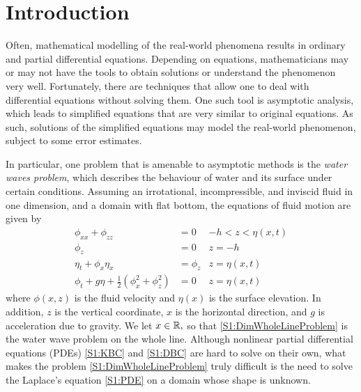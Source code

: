 
\chapter{Introduction} %

\label{chapter1} %

Often, mathematical modelling of the real-world phenomena results in ordinary and partial differential equations. Depending on equations, mathematicians may or may not have the tools to obtain solutions or understand the phenomenon very well. Fortunately, there are techniques that allow one to deal with differential equations without solving them. One such tool is asymptotic analysis, which leads to simplified equations that are very similar to original equations. As such, solutions of the simplified equations may model the real-world phenomenon, subject to some error estimates.

In particular, one problem that is amenable to asymptotic methods is the \textit{water waves problem}, which describes the behaviour of water and its surface under certain conditions. Assuming an irrotational, incompressible, and inviscid fluid in one dimension, and a domain with flat bottom, the equations of fluid motion are given by
\begin{subequations} \label{S1:DimWholeLineProblem}
\begin{align}
\phi_{xx} + \phi_{zz} &= 0 &-h < z < \eta(x,t) \label{S1:PDE}\\
\phi_{z} &= 0 &z = -h \label{S1:BBC}\\
\eta_t + \phi_{x}\eta_{x} &= \phi_{z} & z = \eta(x,t) \label{S1:KBC}\\
\phi_t + g\eta + \frac{1}{2}(\phi_{x}^2 + \phi_{z}^2) &= 0 &z = \eta(x,t) \label{S1:DBC}
\end{align}
\end{subequations}
where $\phi(x,z)$ is the fluid velocity and $\eta(x)$ is the surface elevation. In addition, $z$ is the vertical coordinate, $x$ is the horizontal direction, and $g$ is acceleration due to gravity. We let $x\in\mathbb R,$ so that \eqref{S1:DimWholeLineProblem} is the water wave problem on the whole line. Although nonlinear partial differential equations (PDEs) \eqref{S1:KBC} and \eqref{S1:DBC} are hard to solve on their own, what makes the problem \eqref{S1:DimWholeLineProblem} truly difficult is the need to solve the Laplace's equation \eqref{S1:PDE} on a domain whose shape is unknown. 

